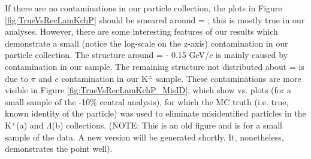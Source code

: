 \documentclass[/home/jesse/Analysis/FemtoAnalysis/AnalysisNotes/AnalysisNoteJBuxton.tex]{subfiles}
\begin{document}
If there are no contaminations in our particle collection, the plots in Figure \ref{fig:TrueVsRecLamKchP} should be smeared around \ktrue = \krec; this is mostly true in our analyses.
However, there are some interesting features of our results which demonstrate a small (notice the log-scale on the z-axis) contamination in our particle collection.
The structure around \krec = \ktrue - 0.15 GeV/$c$ is mainly caused by \Ks contamination in our \LamALam sample.
The remaining structure not distributed about \krec = \ktrue is due to $\pi$ and $e$ contamination in our K$^{\pm}$ sample.
These contaminations are more visible in Figure \ref{fig:TrueVsRecLamKchP_MisID}, which show \krec vs. \ktrue plots (for a small sample of the -10\% central analysis), for which the MC truth (i.e. true, known identity of the particle) was used to eliminate misidentified particles in the K$^{+}$(a) and $\Lambda$(b) collections. (NOTE: This is an old figure and is for a small sample of the data.  A new version will be generated shortly.  It, nonetheless, demonstrates the point well).
\end{document}
